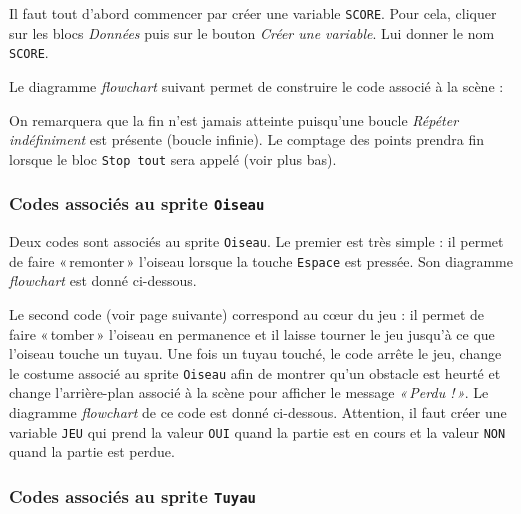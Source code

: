Il faut tout d'abord commencer par créer une variable \texttt{SCORE}. Pour cela, cliquer sur les blocs \emph{Données} puis sur le bouton \emph{Créer une variable}. Lui donner le nom \texttt{SCORE}.

Le diagramme \emph{flowchart} suivant permet de construire le code associé à la scène :



On remarquera que la fin n'est jamais atteinte puisqu'une boucle \emph{Répéter indéfiniment} est présente (boucle infinie). Le comptage des points prendra fin lorsque le bloc \texttt{Stop tout} sera appelé (voir plus bas).





\subsubsection{Codes associés au sprite \texttt{Oiseau}}

Deux codes sont associés au sprite \texttt{Oiseau}. Le premier est très simple : il permet de faire «\,remonter\,» l'oiseau lorsque la touche \texttt{Espace} est pressée. Son diagramme \emph{flowchart} est donné ci-dessous.


\vspace{3cm}

Le second code (voir page suivante) correspond au cœur du jeu : il permet de faire «\,tomber\,» l'oiseau en permanence et il laisse tourner le jeu jusqu'à ce que l'oiseau touche un tuyau. Une fois un tuyau touché, le code arrête le jeu, change le costume associé au sprite \texttt{Oiseau} afin de montrer qu'un obstacle est heurté et change l'arrière-plan associé à la scène pour afficher le message \emph{«\,Perdu !\,»}. Le diagramme \emph{flowchart} de ce code est donné ci-dessous. Attention, il faut créer une variable \texttt{JEU} qui prend la valeur \texttt{OUI} quand la partie est en cours et la valeur \texttt{NON} quand la partie est perdue.

\newpage 



\subsubsection{Codes associés au sprite \texttt{Tuyau}}

